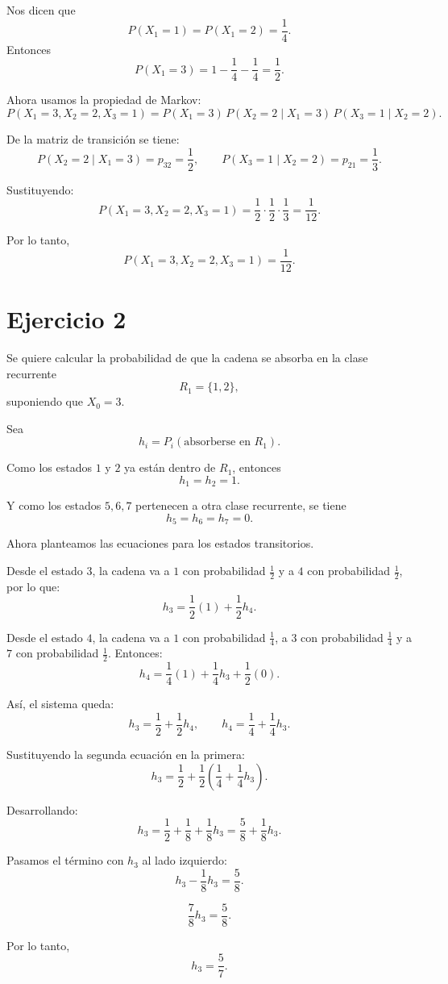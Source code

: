 \documentclass[12pt]{article}
\begin{document}
Nos dicen que
\[
P(X_1=1)=P(X_1=2)=\frac14.
\]
Entonces
\[
P(X_1=3)=1-\frac14-\frac14=\frac12.
\]

Ahora usamos la propiedad de Markov:
\[
P(X_1=3,X_2=2,X_3=1)
=
P(X_1=3)\,P(X_2=2\mid X_1=3)\,P(X_3=1\mid X_2=2).
\]

De la matriz de transición se tiene:
\[
P(X_2=2\mid X_1=3)=p_{32}=\frac12,
\qquad
P(X_3=1\mid X_2=2)=p_{21}=\frac13.
\]

Sustituyendo:
\[
P(X_1=3,X_2=2,X_3=1)
=
\frac12\cdot\frac12\cdot\frac13
=
\frac{1}{12}.
\]

Por lo tanto,
\[
\boxed{P(X_1=3,X_2=2,X_3=1)=\frac{1}{12}}.
\]

\newpage
\section*{Ejercicio 2}

Se quiere calcular la probabilidad de que la cadena se absorba en la clase recurrente
\[
R_1=\{1,2\},
\]
suponiendo que \(X_0=3\).

Sea
\[
h_i=P_i(\text{absorberse en }R_1).
\]

Como los estados \(1\) y \(2\) ya están dentro de \(R_1\), entonces
\[
h_1=h_2=1.
\]

Y como los estados \(5,6,7\) pertenecen a otra clase recurrente, se tiene
\[
h_5=h_6=h_7=0.
\]

Ahora planteamos las ecuaciones para los estados transitorios.

Desde el estado \(3\), la cadena va a \(1\) con probabilidad \(\frac12\) y a \(4\) con probabilidad \(\frac12\), por lo que:
\[
h_3=\frac12(1)+\frac12 h_4.
\]

Desde el estado \(4\), la cadena va a \(1\) con probabilidad \(\frac14\), a \(3\) con probabilidad \(\frac14\) y a \(7\) con probabilidad \(\frac12\). Entonces:
\[
h_4=\frac14(1)+\frac14 h_3+\frac12(0).
\]

Así, el sistema queda:
\[
h_3=\frac12+\frac12 h_4,
\qquad
h_4=\frac14+\frac14 h_3.
\]

Sustituyendo la segunda ecuación en la primera:
\[
h_3=\frac12+\frac12\left(\frac14+\frac14 h_3\right).
\]

Desarrollando:
\[
h_3=\frac12+\frac18+\frac18 h_3
=\frac58+\frac18 h_3.
\]

Pasamos el término con \(h_3\) al lado izquierdo:
\[
h_3-\frac18 h_3=\frac58.
\]

\[
\frac78 h_3=\frac58.
\]

Por lo tanto,
\[
h_3=\frac{5}{7}.
\]
\end{document}
